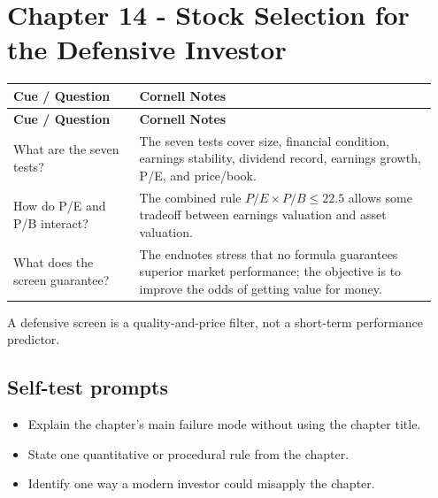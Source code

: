 \documentclass[11pt]{article}
\begin{document}
\section{Chapter 14 - Stock Selection for the Defensive Investor}
\begin{longtable}{@{}>{\raggedright\arraybackslash}p{0.29\linewidth}>{\raggedright\arraybackslash}p{0.66\linewidth}@{}}\toprule\textbf{Cue / Question} & \textbf{Cornell Notes}\\\midrule\endfirsthead\toprule\textbf{Cue / Question} & \textbf{Cornell Notes}\\\midrule\endhead
What are the seven tests? & The seven tests cover size, financial condition, earnings stability, dividend record, earnings growth, P/E, and price/book. \\
How do P/E and P/B interact? & The combined rule $P/E \times P/B \leq 22.5$ allows some tradeoff between earnings valuation and asset valuation. \\
What does the screen guarantee? & The endnotes stress that no formula guarantees superior market performance; the objective is to improve the odds of getting value for money. \\
\bottomrule\end{longtable}
\begin{principlebox}A defensive screen is a quality-and-price filter, not a short-term performance predictor.\end{principlebox}
\subsection*{Self-test prompts}\begin{itemize}\item Explain the chapter's main failure mode without using the chapter title.\item State one quantitative or procedural rule from the chapter.\item Identify one way a modern investor could misapply the chapter.\end{itemize}
\end{document}
